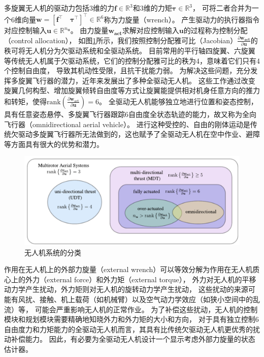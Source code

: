 多旋翼无人机的驱动力包括3维的力$\bm{f} \in \mathbb{R}^3$和3维的力矩$\bm{\tau} \in \mathbb{R}^3$，
可将二者合并为一个6维向量$\bm{w} = \left[\bm{f}^\top \quad \bm{\tau}^\top\right]^\top \in \mathbb{R}^6$称为力旋量（wrench）。
产生驱动力的执行器指令对应控制输入$\bm{u} \in \mathbb{R}^{n_{\bm{u}}}$。
由力旋量$\bm{w_\text{act}}$求解对应控制输入$\bm{u}$的过程称为控制分配（control allocation），
如图\ref{fig:uav_classification}所示，我们按照控制分配雅可比（Jacobian）$\frac{\partial \bm{w_\text{act}}}{\partial \bm{u}}$的秩可将无人机分为欠驱动系统和全驱动系统\cite{bodie2022omnidirectional}。
目前常用的平行轴四旋翼、六旋翼等传统无人机属于欠驱动系统，它们的控制分配雅可比的秩为4，意味着它们只有4个控制自由度，
导致其机动性受限，且抗干扰能力弱。
为解决这些问题，充分发挥多旋翼飞行器的潜力，近年来发展出了多种全驱动无人机。
这些工作通过改变旋翼几何构型、增加旋翼倾转自由度等方式让旋翼能提供相对机身任意方向的推力和转矩，使得$\text{rank}(\frac{\partial \bm{w}_\text{act}}{\partial \bm{u}}) = 6$。
全驱动无人机能够独立地进行位置和姿态控制，具有任意姿态悬停、多旋翼飞行器跟踪6自由度全状态轨迹的能力，故又称为全向飞行器（omnidirectional aerial vehicle）。
进行这种受控的、自由的刚体运动是传统欠驱动多旋翼飞行器所无法做到的，这也赋予了全驱动无人机在空中作业、避障等方面具有很大的优势和潜力。

\begin{figure}[htbp]
    \centering
    \includegraphics[width = \textwidth]{figures/uav_classification.png}
    \caption{无人机系统的分类\cite{bodie2022omnidirectional}}
    \label{fig:uav_classification}
\end{figure}

作用在无人机上的外部力旋量（external wrench）可以等效分解为作用在无人机质心上的外力（external force）和外力矩（external torque），
外力对无人机的平移动力学产生扰动，外力矩则对无人机的旋转动力学产生扰动，
这些扰动的来源可能有风扰、接触、机上载荷（如机械臂）以及空气动力学效应（如狭小空间中的乱流）等，
可能会严重影响无人机的正常作业。
为了补偿这些扰动，无人机的控制模块和规划模块需要精确地知晓外力和外力矩的大小和方向\cite{ding2021vid}，
对于具有独立控制6自由度力和力矩能力的全驱动无人机而言，其具有比传统欠驱动无人机更优秀的扰动补偿能力。
因此，有必要为全驱动无人机设计一个显示考虑外部力旋量的状态估计器。

